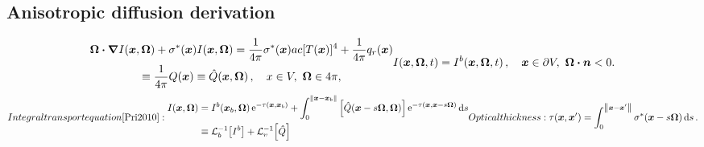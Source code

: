 \documentclass[draft]{beamer}
\begin{document}
\subsection{Anisotropic diffusion derivation}
\begin{frame}%
\begin{subequations} \label{eqs:fullTransport}
\begin{multline} \label{eq:fullTransportVol}
    \vec{\Omega}\vd \grad I(\vec{x}, \vec{\Omega})
    + \sigma^\ast(\vec{x}) I (\vec{x}, \vec{\Omega})
    = \frac{1}{4\pi} \sigma^\ast(\vec{x}) ac [T(\vec{x})]^4
    + \frac{1}{4\pi} q_{r}(\vec{x})
\\
    \equiv \frac{1}{4\pi} Q(\vec{x})
    \equiv \hat Q(\vec{x}, \vec{\Omega}) \,,
\quad
x \in V,\  \vec{\Omega} \in 4\pi,
\end{multline}
\begin{equation} \label{eq:fullTransportBndy}
  I(\vec{x}, \vec{\Omega}, t) = I^b(\vec{x}, \vec{\Omega}, t) \,,
 \quad \vec{x} \in \partial V, \ \vec{\Omega} \vd \vec{n} < 0.
\end{equation}
\end{subequations}
\begin{subequations} \label{eqs:inverseTransport}
  Integral transport equation \cite{Pri2010}:
  \begin{align} \label{eq:inverseTransportFull}
    I(\vec{x}, \vec{\Omega})
    &=
    I^b(\vec{x}_b, \vec{\Omega})
    \eexp^{ -\tau(\vec{x}, \vec{x}_b)}
    + \int_{0}^{\norm{\vec{x} - \vec{x}_b}}
    \left[ \hat Q(\vec{x} - s \vec{\Omega}, \vec{\Omega})
    \right]
    \eexp^{ -\tau(\vec{x}, \vec{x} - s \vec{\Omega})}
    \ud s
    \\ \label{eq:lopinv}
    &\equiv \lopinv{b}{I^b}
    + \lopinv{v}{\hat Q} 
  \end{align}
  Optical thickness: 
  \begin{equation} \label{eq:fullTauDefinition}
    \tau(\vec{x}, \vec{x}') = \int_{0}^{\norm{\vec{x} -
    \vec{x}'}} \sigma^\ast(\vec{x}-s\vec{\Omega}) \ud s \,.
  \end{equation}
\end{subequations}
\end{frame}
\end{document}
